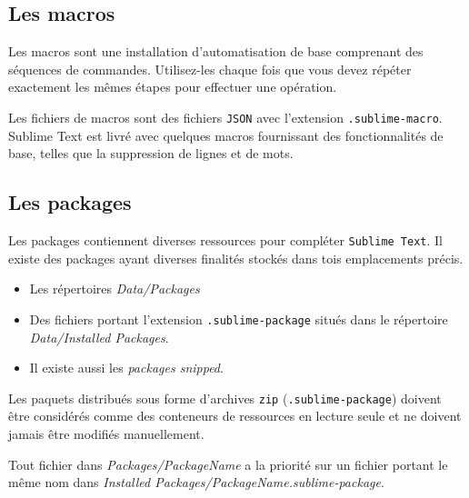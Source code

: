 \documentclass[french,a4paper]{article}
\begin{document}
\subsection*{Les macros}
Les macros sont une installation d'automatisation de base comprenant des 
séquences de commandes. Utilisez-les chaque fois que vous devez répéter 
exactement les mêmes étapes pour effectuer une opération.
\medskip

Les fichiers de macros sont des fichiers \texttt{JSON} avec l'extension 
\texttt{.sublime-macro}. Sublime Text est livré avec quelques macros 
fournissant des fonctionnalités de base, telles que la suppression de lignes et
de mots.
\bigskip

\subsection*{Les packages}
Les packages contiennent diverses ressources pour compléter \texttt{Sublime 
Text}. Il existe des packages ayant diverses finalités stockés dans tois
emplacements précis.
\begin{itemize}
    \item Les répertoires \textit{Data/Packages}
    \item Des fichiers portant l'extension \texttt{.sublime-package} situés 
    dans le répertoire \textit{Data/Installed Packages}.
    \item Il existe aussi les \textit{packages snipped}.
\end{itemize}
\medskip

Les paquets distribués sous forme d'archives \texttt{zip} 
(\texttt{.sublime-package}) doivent être considérés comme des conteneurs de 
ressources en lecture seule et ne doivent jamais être modifiés manuellement.
\medskip

Tout fichier dans \textit{Packages/PackageName} a la priorité sur un fichier 
portant le même nom dans 
\textit{Installed Packages/PackageName.sublime-package}.
\medskip
\end{document}
